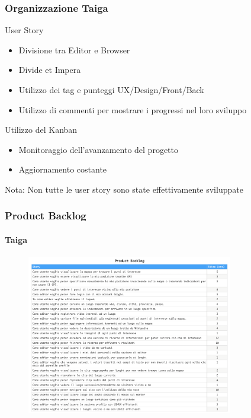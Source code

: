 \documentclass{beamer}
\begin{document}
\begin{frame}
\frametitle{Organizzazione Taiga}
User Story
  \begin{itemize}
  	\item Divisione tra Editor e Browser
	\item Divide et Impera
	\item Utilizzo dei tag e punteggi UX/Design/Front/Back
	\item Utilizzo di commenti per mostrare i progressi nel loro sviluppo
  \end{itemize}
\vspace{5mm}
  Utilizzo del Kanban
    \begin{itemize}
	\item Monitoraggio dell'avanzamento del progetto
	\item Aggiornamento costante
  \end{itemize}
  \vspace{5mm}
  Nota: Non tutte le user story sono state effettivamente sviluppate
\end{frame}

\begin{frame}
\frametitle{Product Backlog}
\framesubtitle{Taiga}	   
  \begin{figure}[h]
  	\centering 
        \includegraphics[width=9cm]{Images/Taiga/UserStory/backlog.png}
   \end{figure}
\end{frame}
\end{document}
